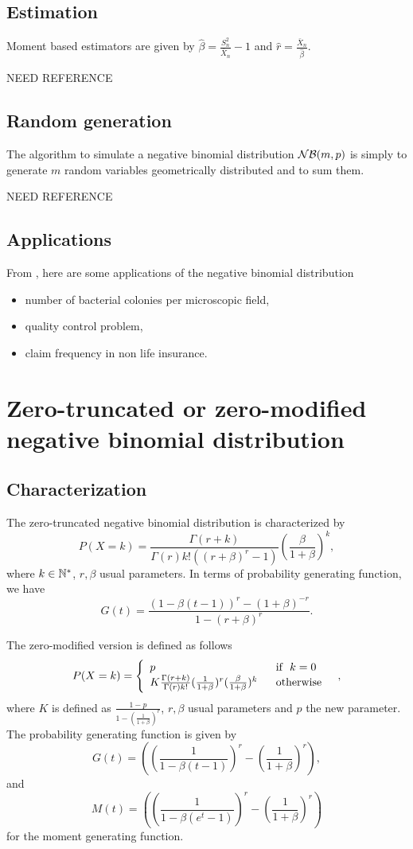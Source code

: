 \subsection{Estimation}
Moment based estimators are given by $\hat \beta = \frac{S_n^2}{\bar X_n}-1$ and $\hat r = \frac{\bar X_n}{\hat \beta}$. 

NEED REFERENCE

\subsection{Random generation}
The algorithm to simulate a negative binomial distribution $\mathcal N\mathcal B(m,p)$ is simply to generate $m$ random variables geometrically distributed and to sum them.

NEED REFERENCE

\subsection{Applications}
From \cite{simon}, here are some applications of the negative binomial distribution
\begin{itemize}
\item number of bacterial colonies per microscopic field,
\item quality control problem,
\item claim frequency in non life insurance.
\end{itemize}

\section{Zero-truncated or zero-modified negative binomial distribution}
\subsection{Characterization}
The zero-truncated negative binomial distribution is characterized by
$$
P(X=k) = \frac{\Gamma(r+k)}{\Gamma(r)k!((r+\beta)^r-1)} (\frac{\beta}{1+\beta})^k,
$$
where $k\in \mathbb N^*$, $r,\beta$ usual parameters. In terms of probability generating function,
we have
$$
G(t) =  \frac{(1-\beta(t-1))^r-(1+\beta)^{-r}}{1-(r+\beta)^r}.
$$ 

The zero-modified version is defined as follows
$$
P(X=k)=\left\{
\begin{array}{ll}
p & \textrm{~~if~~} k=0\\
K\frac{\Gamma(r+k)}{\Gamma(r)k!} (\frac{1}{1+\beta})^r(\frac{\beta}{1+\beta})^k & \textrm{~~otherwise~~}\\
\end{array}
\right. ,
$$
where $K$ is defined as $\frac{1-p}{1- (\frac{1}{1+\beta})^r}$, $r,\beta$ usual parameters and $p$ the new parameter. The probability generating function is given by
$$
G(t) = \left((\frac{1}{1-\beta(t-1)})^r-(\frac{1}{1+\beta})^r\right),
$$
and 
$$
M(t) = \left((\frac{1}{1-\beta(e^t-1)})^r-(\frac{1}{1+\beta})^r\right)
$$
for the moment generating function.

